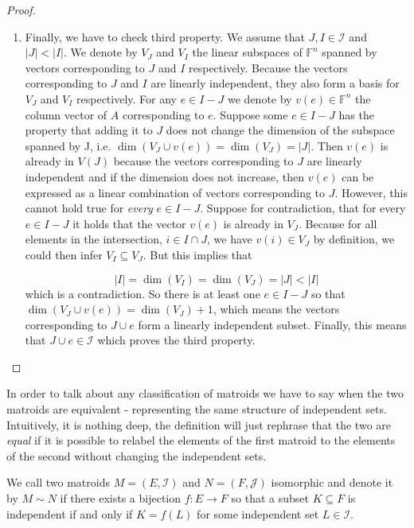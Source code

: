 \begin{proof}
\begin{enumerate}
    \item Finally, we have to check third property. We assume that $J, I \in \mathcal{I}$ and $|J| < |I|$. We denote by $V_J$ and $V_I$ the linear subspaces of $\mathbb{F}^n$ spanned by vectors corresponding to $J$ and $I$ respectively. Because the vectors corresponding to $J$ and $I$ are linearly independent, they also form a basis for $V_J$ and $V_I$ respectively. For any $e \in I - J$ we denote by $v(e) \in \mathbb{F}^n$ the column vector of $A$ corresponding to $e$. Suppose some $e \in I - J$ has the property that adding it to $J$ does not change the dimension of the subspace spanned by J, i.e. $\dim (V_J \cup v(e)) = \dim (V_J) = |J|$. Then $v(e)$ is already in $V(J)$ because the vectors corresponding to $J$ are linearly independent and if the dimension does not increase, then $v(e)$ can be expressed as a linear combination of vectors corresponding to $J$. However, this cannot hold true for \textit{every} $e \in I - J$. Suppose for contradiction, that for every $e \in I - J$ it holds that the vector $v(e) $ is already in $ V_J$. Because for all elements in the intersection,  $i \in I \cap J$, we have $v(i) \in V_J$ by definition, we could then infer $V_I \subseteq V_J$. But this implies that 

    $$|I| = \dim(V_I) = \dim(V_J) = |J| < |I|$$
     which is a contradiction. So there is at least one $e \in I - J$ so that $\dim(V_J \cup v(e)) = \dim(V_J) + 1$, which means the vectors corresponding to $J \cup e$ form a linearly independent subset. Finally, this means that $J \cup e \in \mathcal{I}$ which proves the third property.

\end{enumerate}
\end{proof}

In order to talk about any classification of matroids we have to say when the two matroids are equivalent - representing the same structure of independent sets. Intuitively, it is nothing deep, the definition will just rephrase that the two are \textit{equal} if it is possible to relabel the elements of the first matroid to the elements of the second without changing the independent sets.

\begin{defn}
    We call two matroids $M = (E, \mathcal{I})$ and $N = (F, \mathcal{J})$ isomorphic and denote it by $M \sim N$ if there exists a bijection $f: E \to F$ so that a subset $K \subseteq F$ is independent if and only if $K = f(L)$ for some independent set $L \in \mathcal{I}$.
\end{defn}



